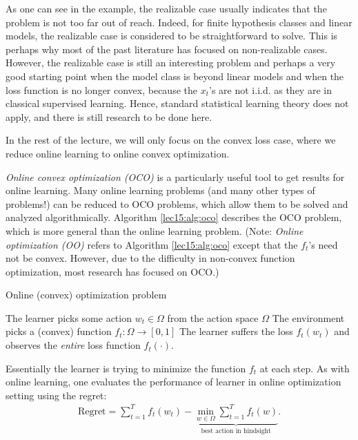 As one can see in the example, the realizable case usually indicates that the problem is not too far out of reach. Indeed, for finite hypothesis classes and linear models, the realizable case is considered to be straightforward to solve. This is perhaps why most of the past literature has focused on non-realizable cases. However, the realizable case is still an interesting problem and perhaps a very good starting point when the model class is beyond linear models and when the loss function is no longer convex, because the $x_t$'s are not i.i.d. as they are in classical supervised learning. Hence, standard statistical learning theory does not apply, and there is still research to be done here.
 
In the rest of the lecture, we will only focus on the convex loss case, where we reduce online learning to online convex optimization. 
    

\textit{Online convex optimization (OCO)} is a particularly useful tool to get results for online learning. Many online learning problems (and many other types of problems!) can be reduced to OCO problems, which allow them to be solved and analyzed algorithmically. Algorithm \ref{lec15:alg:oco} describes the OCO problem, which is more general than the online learning problem. (Note: \textit{Online optimization (OO)} refers to Algorithm \ref{lec15:alg:oco} except that the $f_t$'s need not be convex. However, due to the difficulty in non-convex function optimization, most research has focused on OCO.)

    \begin{algorithm}\label{lec15:alg:oco}
    \caption{Online (convex) optimization problem}
     {
        The learner picks some action $w_t \in \Omega$ from the action space $\Omega$\;
        The environment picks a (convex) function $f_t: \Omega \to [0, 1]$\;
        The learner suffers the loss $f_t(w_t)$ and observes the \emph{entire} loss function $f_t(\cdot)$.
        }
    \end{algorithm}
    
Essentially the learner is trying to minimize the function $f_t$ at each step. As with online learning, one evaluates the performance of learner in online optimization setting using the regret:
\begin{align}
\text{Regret} = \sum_{t=1}^T f_t(w_t) - 
\underbrace{\min_{w \in \Omega} \sum_{t=1}^T f_t(w)}_\text{best action in hindsight}.
\end{align}

